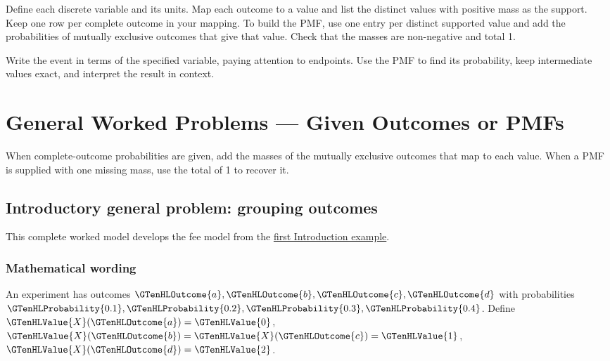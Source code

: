 \noindent{} Define each discrete variable and its units. Map each outcome to a value and list the distinct values with positive mass as the support. Keep one row per complete outcome in your mapping. To build the PMF, use one entry per distinct supported value and add the probabilities of mutually exclusive outcomes that give that value. Check that the masses are non-negative and total 1.

\noindent{} Write the event in terms of the specified variable, paying attention to endpoints. Use the PMF to find its probability, keep intermediate values exact, and interpret the result in context.


\section{General Worked Problems --- Given Outcomes or PMFs}\label{sec:t2-c1-given-outcomes-or-pmfs}

 \vspace{5mm}

When complete-outcome probabilities are given, add the masses of the mutually exclusive outcomes that map to each value. When a PMF is supplied with one missing mass, use the total of 1 to recover it.

\subsection{Introductory general problem: grouping outcomes}
\label{subsec:t2-c1-introductory-general-problem-grouping-outcomes}
This complete worked model develops the fee model from the \hyperref[subsec:t2-c1-given-outcomes]{first Introduction example}.

\subsubsection*{Mathematical wording}
An experiment has outcomes $\GTenHLOutcome{a},\GTenHLOutcome{b},\GTenHLOutcome{c},\GTenHLOutcome{d}$ with probabilities $\GTenHLProbability{0.1},\GTenHLProbability{0.2},\GTenHLProbability{0.3},\GTenHLProbability{0.4}$. Define $\GTenHLValue{X}(\GTenHLOutcome{a})=\GTenHLValue{0}$, $\GTenHLValue{X}(\GTenHLOutcome{b})=\GTenHLValue{X}(\GTenHLOutcome{c})=\GTenHLValue{1}$, $\GTenHLValue{X}(\GTenHLOutcome{d})=\GTenHLValue{2}$.

